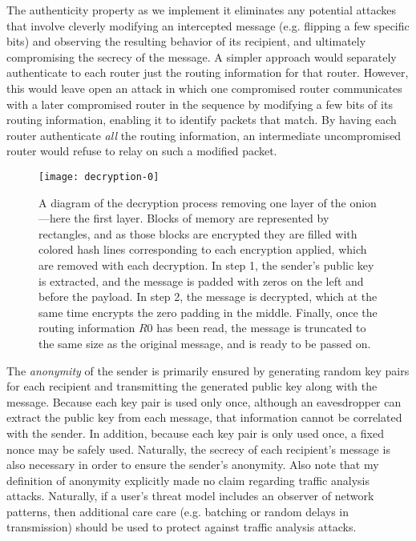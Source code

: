 \documentclass[letterpaper,twocolumn,amsmath,amssymb,pre,aps,10pt]{revtex4-1}
\begin{document}
The authenticity property as we implement it eliminates any potential
attackes that involve cleverly modifying an intercepted message
(e.g. flipping a few specific bits) and observing the resulting
behavior of its recipient, and ultimately compromising the secrecy of
the message.  A simpler approach would separately authenticate to each
router just the routing information for that router.  However, this
would leave open an attack in which one compromised router communicates with a
later compromised router in the sequence by modifying a few bits of
its routing information, enabling it to identify packets that match.
By having each router authenticate \emph{all} the routing information,
an intermediate uncompromised router would refuse to relay on such a
modified packet.

\begin{figure*}
  \begin{center}
    \texttt{[image: decryption-0]}
  \end{center}
  \caption{A diagram of the decryption process removing one layer of
    the onion---here the first layer.  Blocks of memory are
    represented by rectangles, and as those blocks are encrypted they
    are filled with colored hash lines corresponding to each
    encryption applied, which are removed with each decryption.  In
    step 1, the sender's public key is extracted, and the message is
    padded with zeros on the left and before the payload.  In step 2,
    the message is decrypted, which at the same time encrypts the zero
    padding in the middle.  Finally, once the routing information $R0$
    has been read, the message is truncated to the same size as the
    original message, and is ready to be passed
    on.}\label{fig:decryption}
\end{figure*}

The \emph{anonymity} of the sender is primarily ensured by generating
random key pairs for each recipient and transmitting the generated
public key along with the message.  Because each key pair is used only
once, although an eavesdropper can extract the public key from each
message, that information cannot be correlated with the sender.  In
addition, because each key pair is only used once, a fixed nonce may
be safely used.  Naturally, the secrecy of each recipient's message is
also necessary in order to ensure the sender's anonymity.  Also note
that my definition of anonymity explicitly made no claim regarding
traffic analysis attacks.  Naturally, if a user's threat model
includes an observer of network patterns, then additional care care
(e.g. batching or random delays in transmission) should be used to
protect against traffic analysis attacks.
\end{document}

